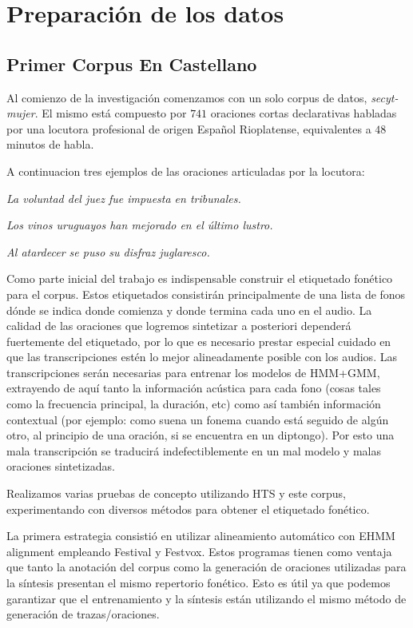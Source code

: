 \section{Preparación de los datos}

\subsection{Primer Corpus En Castellano}

Al comienzo de la investigación comenzamos con un solo corpus de datos, \textit{secyt-mujer}\cite{secytMujer}. El mismo está compuesto por $741$ oraciones cortas declarativas habladas por una locutora profesional de origen Español Rioplatense, equivalentes a $48$ minutos de habla.

A continuacion tres ejemplos de las oraciones articuladas por la locutora:

\indent\indent \textit{La voluntad del juez fue impuesta en tribunales.}

\indent\indent \textit{Los vinos uruguayos han mejorado en el último lustro.}

\indent\indent \textit{Al atardecer se puso su disfraz juglaresco.}

Como parte inicial del trabajo es indispensable construir el etiquetado fonético para el corpus. Estos etiquetados consistirán principalmente de una lista de fonos dónde se indica donde comienza y donde termina cada uno en el audio. La calidad de las oraciones que logremos sintetizar a posteriori dependerá fuertemente del etiquetado, por lo que es necesario prestar especial cuidado en que las transcripciones estén lo mejor alineadamente posible con los audios. Las transcripciones serán necesarias para entrenar los modelos de HMM+GMM, extrayendo de aquí tanto la información acústica para cada fono (cosas tales como la frecuencia principal, la duración, etc) como así también información contextual (por ejemplo: como suena un fonema cuando está seguido de algún otro, al principio de una oración, si se encuentra en un diptongo). Por esto una mala transcripción se traducirá indefectiblemente en un mal modelo y malas oraciones sintetizadas.

Realizamos varias pruebas de concepto utilizando HTS y este corpus, experimentando con diversos métodos para obtener el etiquetado fonético. 

La primera estrategia consistió en utilizar alineamiento automático con EHMM alignment \cite{phoneticCapturing} empleando Festival y Festvox. Estos programas tienen como ventaja que tanto la anotación del corpus como la generación de oraciones utilizadas para la síntesis presentan el mismo repertorio fonético. Esto es útil ya que podemos garantizar que el entrenamiento y la síntesis están utilizando el mismo método de generación de trazas/oraciones.

